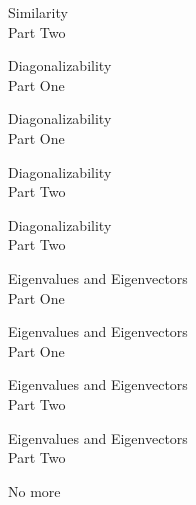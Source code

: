 \documentclass{titlescreen}
\begin{document}
\begin{videotitle}
  Similarity \\[1ex]
  Part Two
\end{videotitle}
\begin{videoend}
  Diagonalizability \\[1ex]
  Part One
\end{videoend}

\begin{videotitle}
  Diagonalizability \\[1ex]
  Part One
\end{videotitle}
\begin{videoend}
  Diagonalizability \\[1ex]
  Part Two
\end{videoend}

\begin{videotitle}
  Diagonalizability \\[1ex]
  Part Two
\end{videotitle}
\begin{videoend}
  Eigenvalues and Eigenvectors \\[1ex]
  Part One
\end{videoend}

\begin{videotitle}
  Eigenvalues and Eigenvectors \\[1ex]
  Part One
\end{videotitle}
\begin{videoend}
  Eigenvalues and Eigenvectors \\[1ex]
  Part Two
\end{videoend}

\begin{videotitle}
  Eigenvalues and Eigenvectors \\[1ex]
  Part Two
\end{videotitle}
\begin{videoend}
  No more
\end{videoend}





\end{document}
